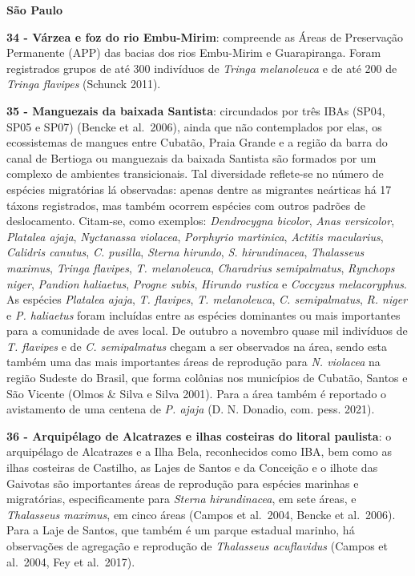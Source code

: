 \documentclass[
  oneside]{scrbook}
\begin{document}
\textbf{São Paulo}

\textbf{34 - Várzea e foz do rio Embu-Mirim}: compreende as Áreas de Preservação Permanente (APP) das bacias dos rios Embu-Mirim e Guarapiranga. Foram registrados grupos de até 300 indivíduos de \emph{Tringa melanoleuca} e de até 200 de \emph{Tringa flavipes} (Schunck 2011).

\textbf{35 - Manguezais da baixada Santista}: circundados por três IBAs (SP04, SP05 e SP07) (Bencke et al.~2006), ainda que não contemplados por elas, os ecossistemas de mangues entre Cubatão, Praia Grande e a região da barra do canal de Bertioga ou manguezais da baixada Santista são formados por um complexo de ambientes transicionais. Tal diversidade reflete-se no número de espécies migratórias lá observadas: apenas dentre as migrantes neárticas há 17 táxons registrados, mas também ocorrem espécies com outros padrões de deslocamento. Citam-se, como exemplos: \emph{Dendrocygna bicolor}, \emph{Anas versicolor}, \emph{Platalea ajaja}, \emph{Nyctanassa violacea}, \emph{Porphyrio martinica}, \emph{Actitis macularius}, \emph{Calidris canutus}, \emph{C. pusilla}, \emph{Sterna hirundo}, \emph{S. hirundinacea}, \emph{Thalasseus maximus}, \emph{Tringa flavipes}, \emph{T. melanoleuca}, \emph{Charadrius semipalmatus}, \emph{Rynchops niger}, \emph{Pandion haliaetus}, \emph{Progne subis}, \emph{Hirundo rustica} e \emph{Coccyzus melacoryphus}. As espécies \emph{Platalea ajaja}, \emph{T. flavipes}, \emph{T. melanoleuca}, \emph{C. semipalmatus}, \emph{R. niger} e \emph{P. haliaetus} foram incluídas entre as espécies dominantes ou mais importantes para a comunidade de aves local. De outubro a novembro quase mil indivíduos de \emph{T. flavipes} e de \emph{C. semipalmatus} chegam a ser observados na área, sendo esta também uma das mais importantes áreas de reprodução para \emph{N. violacea} na região Sudeste do Brasil, que forma colônias nos municípios de Cubatão, Santos e São Vicente (Olmos \& Silva e Silva 2001). Para a área também é reportado o avistamento de uma centena de \emph{P. ajaja} (D. N. Donadio, com. pess. 2021).

\textbf{36 - Arquipélago de Alcatrazes e ilhas costeiras do litoral paulista}: o arquipélago de Alcatrazes e a Ilha Bela, reconhecidos como IBA, bem como as ilhas costeiras de Castilho, as Lajes de Santos e da Conceição e o ilhote das Gaivotas são importantes áreas de reprodução para espécies marinhas e migratórias, especificamente para \emph{Sterna hirundinacea}, em sete áreas, e \emph{Thalasseus maximus}, em cinco áreas (Campos et al.~2004, Bencke et al.~2006). Para a Laje de Santos, que também é um parque estadual marinho, há observações de agregação e reprodução de \emph{Thalasseus acuflavidus} (Campos et al.~2004, Fey et al.~2017).
\end{document}
